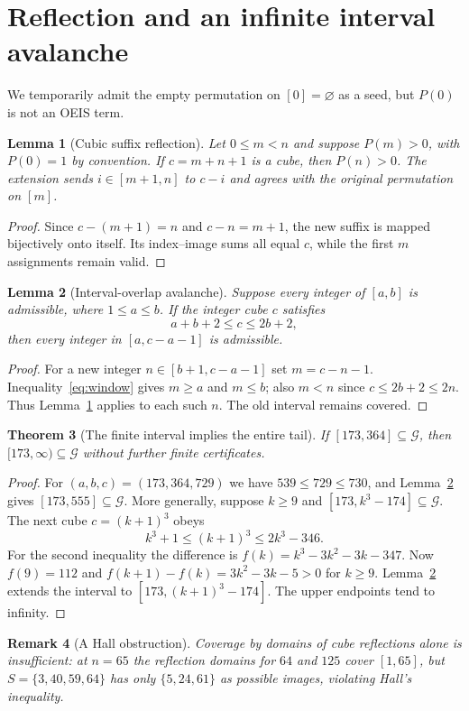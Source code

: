 \documentclass[9pt]{extarticle}
\newtheorem{theorem}{Theorem}[section]
\newtheorem{lemma}[theorem]{Lemma}
\newtheorem{remark}[theorem]{Remark}
\newcommand{\G}{\mathcal G}
\begin{document}
\section{Reflection and an infinite interval avalanche}\label{sec:reflection}
We temporarily admit the empty permutation on $[0]=\varnothing$ as a seed, but $P(0)$ is not an OEIS term.
\begin{lemma}[Cubic suffix reflection]\label{lem:suffix}
Let $0\le m<n$ and suppose $P(m)>0$, with $P(0)=1$ by convention. If $c=m+n+1$ is a cube, then $P(n)>0$. The extension sends $i\in[m+1,n]$ to $c-i$ and agrees with the original permutation on $[m]$.
\end{lemma}
\begin{proof}
Since $c-(m+1)=n$ and $c-n=m+1$, the new suffix is mapped bijectively onto itself. Its index--image sums all equal $c$, while the first $m$ assignments remain valid.
\end{proof}
\begin{lemma}[Interval-overlap avalanche]\label{lem:avalanche}
Suppose every integer of $[a,b]$ is admissible, where $1\le a\le b$. If the integer cube $c$ satisfies
\begin{equation}\label{eq:window} a+b+2\le c\le2b+2,\end{equation}
then every integer in $[a,c-a-1]$ is admissible.
\end{lemma}
\begin{proof}
For a new integer $n\in[b+1,c-a-1]$ set $m=c-n-1$. Inequality~\eqref{eq:window} gives $m\ge a$ and $m\le b$; also $m<n$ since $c\le2b+2\le2n$. Thus Lemma~\ref{lem:suffix} applies to each such $n$. The old interval remains covered.
\end{proof}
\begin{theorem}[The finite interval implies the entire tail]\label{thm:tail}
If $[173,364]\subseteq\G$, then $[173,\infty)\subseteq\G$ without further finite certificates.
\end{theorem}
\begin{proof}
For $(a,b,c)=(173,364,729)$ we have $539\le729\le730$, and Lemma~\ref{lem:avalanche} gives $[173,555]\subseteq\G$. More generally, suppose $k\ge9$ and $[173,k^3-174]\subseteq\G$. The next cube $c=(k+1)^3$ obeys
\[
 k^3+1\le(k+1)^3\le2k^3-346.
\]
For the second inequality the difference is $f(k)=k^3-3k^2-3k-347$. Now $f(9)=112$ and $f(k+1)-f(k)=3k^2-3k-5>0$ for $k\ge9$. Lemma~\ref{lem:avalanche} extends the interval to $[173,(k+1)^3-174]$. The upper endpoints tend to infinity.
\end{proof}
\begin{remark}[A Hall obstruction]
Coverage by domains of cube reflections alone is insufficient: at $n=65$ the reflection domains for $64$ and $125$ cover $[1,65]$, but $S=\{3,40,59,64\}$ has only $\{5,24,61\}$ as possible images, violating Hall's inequality.
\end{remark}
\end{document}
